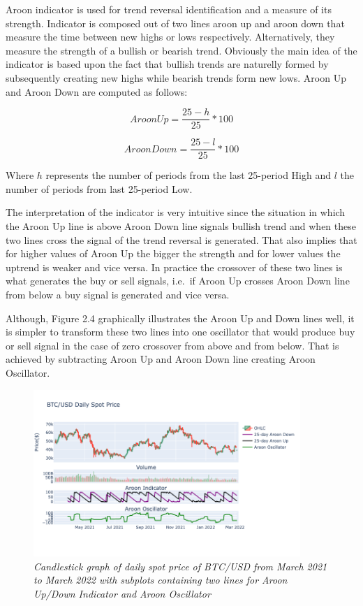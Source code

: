Aroon indicator is used for trend reversal identification and a measure of its strength. Indicator is composed out of two lines aroon up and aroon down that measure the time between new highs or lows respectively. Alternatively, they measure the strength of a bullish or bearish trend. Obviously the main idea of the indicator is based upon the fact that bullish trends are naturelly formed by subsequently creating new highs while bearish trends form new lows. Aroon Up and Aroon Down are computed as follows:

\begin{equation}
Aroon Up = \frac{25 - h}{25} * 100
\end{equation}
 
\begin{equation}
Aroon Down = \frac{25 - l}{25} * 100
\end{equation}

Where $h$ represents the number of periods from the last 25-period High and $l$ the number of periods from last 25-period Low. 

The interpretation of the indicator is very intuitive since the situation in which the Aroon Up line is above Aroon Down line signals bullish trend and when these two lines cross the signal of the trend reversal is generated. That also implies that for higher values of Aroon Up the bigger the strength and for lower values the uptrend is weaker and vice versa. In practice the crossover of these two lines is what generates the buy or sell signals, i.e.\ if Aroon Up crosses Aroon Down line from below a buy signal is generated and vice versa. 

Although, Figure 2.4 graphically illustrates the Aroon Up and Down lines well, it is simpler to transform these two lines into one oscillator that would produce buy or sell signal in the case of zero crossover from above and from below. That is achieved by subtracting Aroon Up and Aroon Down line creating Aroon Oscillator.

\begin{figure}[ht]
\begin{center}
	\includegraphics[width=0.9\textwidth]{Figs/Aroon.png}
\end{center}
\caption{\textit{Candlestick graph of daily spot price of BTC/USD from March 2021 to March 2022 with subplots containing two lines for Aroon Up/Down Indicator and Aroon Oscillator}}
\end{figure}
